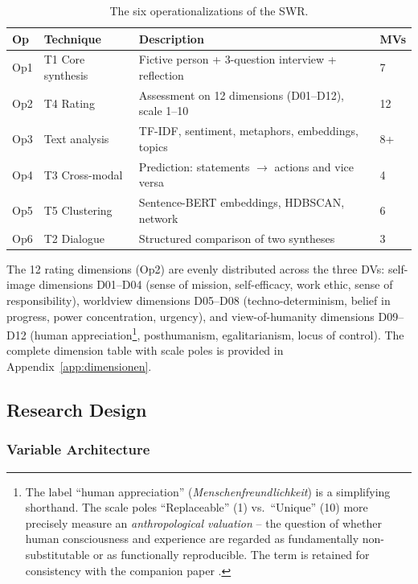 \documentclass[12pt,a4paper]{article}
\begin{document}
\begin{table}[htbp]
  \centering
  \caption{The six operationalizations of the SWR.}
  \label{tab:ops}
  \small
  \begin{tabularx}{\textwidth}{l l X l}
    \toprule
    \textbf{Op} & \textbf{Technique} & \textbf{Description} & \textbf{MVs} \\
    \midrule
    Op1 & T1 Core synthesis & Fictive person + 3-question interview + reflection & 7 \\
    Op2 & T4 Rating & Assessment on 12 dimensions (D01--D12), scale 1--10 & 12 \\
    Op3 & Text analysis & TF-IDF, sentiment, metaphors, embeddings, topics & 8+ \\
    Op4 & T3 Cross-modal & Prediction: statements $\to$ actions and vice versa & 4 \\
    Op5 & T5 Clustering & Sentence-BERT embeddings, HDBSCAN, network & 6 \\
    Op6 & T2 Dialogue & Structured comparison of two syntheses & 3 \\
    \bottomrule
  \end{tabularx}
\end{table}

The 12 rating dimensions (Op2) are evenly distributed across the three DVs: self-image dimensions D01--D04 (sense of mission, self-efficacy, work ethic, sense of responsibility), worldview dimensions D05--D08 (techno-determinism, belief in progress, power concentration, urgency), and view-of-humanity dimensions D09--D12 (human appreciation\footnote{The label ``human appreciation'' (\emph{Menschenfreundlichkeit}) is a simplifying shorthand. The scale poles ``Replaceable'' (1) vs.\ ``Unique'' (10) more precisely measure an \emph{anthropological valuation} -- the question of whether human consciousness and experience are regarded as fundamentally non-substitutable or as functionally reproducible. The term is retained for consistency with the companion paper \citep{Geiger2026SWR}.}, posthumanism, egalitarianism, locus of control). The complete dimension table with scale poles is provided in Appendix~\ref{app:dimensionen}.


\subsection{Research Design}
\label{sec:methodik:design}

\subsubsection{Variable Architecture}
\end{document}
